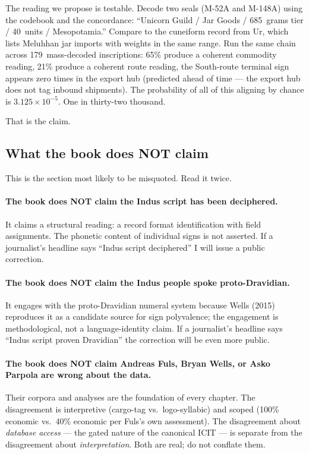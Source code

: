 The reading we propose is testable. Decode two seals (M-52A and
M-148A) using the codebook and the concordance: ``Unicorn Guild /
Jar Goods / 685~grams tier / 40~units / Mesopotamia.'' Compare to
the cuneiform record from Ur, which lists Meluhhan jar imports
with weights in the same range. Run the same chain across
179~mass-decoded inscriptions: 65\% produce a coherent commodity
reading, 21\% produce a coherent route reading, the South-route
terminal sign appears zero times in the export hub
(predicted ahead of time --- the export hub does not tag inbound
shipments). The probability of all of this aligning by chance is
$3.125 \times 10^{-5}$. One in thirty-two thousand.

That is the claim.

\subsection{What the book does NOT claim}

This is the section most likely to be misquoted. Read it twice.

\paragraph{The book does NOT claim the Indus script has been
deciphered.} It claims a structural reading: a record format
identification with field assignments. The phonetic content of
individual signs is not asserted. If a journalist's headline says
``Indus script deciphered'' I will issue a public correction.

\paragraph{The book does NOT claim the Indus people spoke
proto-Dravidian.} It engages with the proto-Dravidian numeral
system because Wells (2015) reproduces it as a candidate source
for sign polyvalence; the engagement is methodological, not a
language-identity claim. If a journalist's headline says ``Indus
script proven Dravidian'' the correction will be even more
public.

\paragraph{The book does NOT claim Andreas Fuls, Bryan Wells, or
Asko Parpola are wrong about the data.} Their corpora and
analyses are the foundation of every chapter. The disagreement
is interpretive (cargo-tag vs.\ logo-syllabic) and scoped (100\%
economic vs.\ 40\% economic per Fuls's own assessment). The
disagreement about \emph{database access} --- the gated nature of
the canonical ICIT --- is separate from the disagreement about
\emph{interpretation}. Both are real; do not conflate them.

